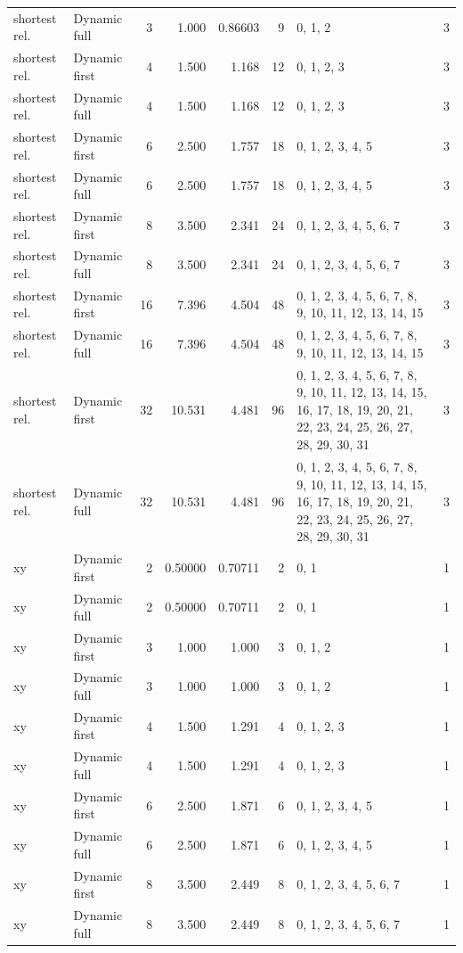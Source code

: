 \documentclass[10pt,a4paper]{article}
\begin{document}
\begin{longtable}{@{}p{23mm}p{29mm}rrrrp{36mm}r@{}}
shortest rel. & Dynamic full & 3 & 1.000 & 0.86603 & 9 & 0, 1, 2 & 3 \\
shortest rel. & Dynamic first & 4 & 1.500 & 1.168 & 12 & 0, 1, 2, 3 & 3 \\
shortest rel. & Dynamic full & 4 & 1.500 & 1.168 & 12 & 0, 1, 2, 3 & 3 \\
shortest rel. & Dynamic first & 6 & 2.500 & 1.757 & 18 & 0, 1, 2, 3, 4, 5 & 3 \\
shortest rel. & Dynamic full & 6 & 2.500 & 1.757 & 18 & 0, 1, 2, 3, 4, 5 & 3 \\
shortest rel. & Dynamic first & 8 & 3.500 & 2.341 & 24 & 0, 1, 2, 3, 4, 5, 6, 7 & 3 \\
shortest rel. & Dynamic full & 8 & 3.500 & 2.341 & 24 & 0, 1, 2, 3, 4, 5, 6, 7 & 3 \\
shortest rel. & Dynamic first & 16 & 7.396 & 4.504 & 48 & 0, 1, 2, 3, 4, 5, 6, 7, 8, 9, 10, 11, 12, 13, 14, 15 & 3 \\
shortest rel. & Dynamic full & 16 & 7.396 & 4.504 & 48 & 0, 1, 2, 3, 4, 5, 6, 7, 8, 9, 10, 11, 12, 13, 14, 15 & 3 \\
shortest rel. & Dynamic first & 32 & 10.531 & 4.481 & 96 & 0, 1, 2, 3, 4, 5, 6, 7, 8, 9, 10, 11, 12, 13, 14, 15, 16, 17, 18, 19, 20, 21, 22, 23, 24, 25, 26, 27, 28, 29, 30, 31 & 3 \\
shortest rel. & Dynamic full & 32 & 10.531 & 4.481 & 96 & 0, 1, 2, 3, 4, 5, 6, 7, 8, 9, 10, 11, 12, 13, 14, 15, 16, 17, 18, 19, 20, 21, 22, 23, 24, 25, 26, 27, 28, 29, 30, 31 & 3 \\
xy & Dynamic first & 2 & 0.50000 & 0.70711 & 2 & 0, 1 & 1 \\
xy & Dynamic full & 2 & 0.50000 & 0.70711 & 2 & 0, 1 & 1 \\
xy & Dynamic first & 3 & 1.000 & 1.000 & 3 & 0, 1, 2 & 1 \\
xy & Dynamic full & 3 & 1.000 & 1.000 & 3 & 0, 1, 2 & 1 \\
xy & Dynamic first & 4 & 1.500 & 1.291 & 4 & 0, 1, 2, 3 & 1 \\
xy & Dynamic full & 4 & 1.500 & 1.291 & 4 & 0, 1, 2, 3 & 1 \\
xy & Dynamic first & 6 & 2.500 & 1.871 & 6 & 0, 1, 2, 3, 4, 5 & 1 \\
xy & Dynamic full & 6 & 2.500 & 1.871 & 6 & 0, 1, 2, 3, 4, 5 & 1 \\
xy & Dynamic first & 8 & 3.500 & 2.449 & 8 & 0, 1, 2, 3, 4, 5, 6, 7 & 1 \\
xy & Dynamic full & 8 & 3.500 & 2.449 & 8 & 0, 1, 2, 3, 4, 5, 6, 7 & 1 \\

\end{longtable}
\end{document}
